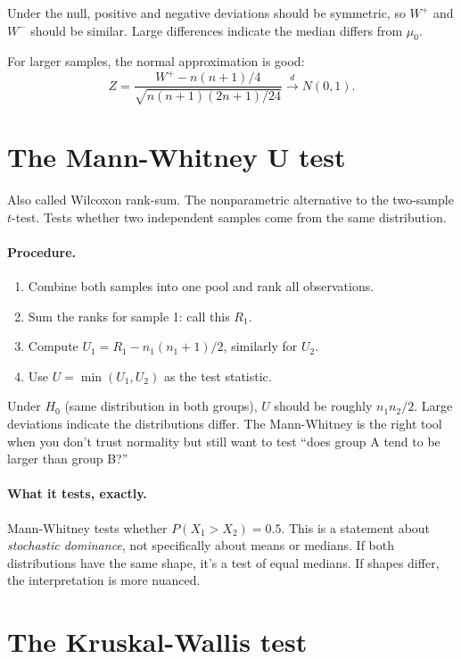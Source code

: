 Under the null, positive and negative deviations should be symmetric, so $W^+$ and $W^-$ should be similar. Large differences indicate the median differs from $\mu_0$.

For larger samples, the normal approximation is good:
\[
  Z = \frac{W^+ - n(n+1)/4}{\sqrt{n(n+1)(2n+1)/24}} \xrightarrow{d} N(0, 1).
\]

\section{The Mann-Whitney U test}

Also called Wilcoxon rank-sum. The nonparametric alternative to the two-sample $t$-test. Tests whether two independent samples come from the same distribution.

\paragraph{Procedure.}
\begin{enumerate}[noitemsep]
  \item Combine both samples into one pool and rank all observations.
  \item Sum the ranks for sample 1: call this $R_1$.
  \item Compute $U_1 = R_1 - n_1(n_1+1)/2$, similarly for $U_2$.
  \item Use $U = \min(U_1, U_2)$ as the test statistic.
\end{enumerate}

Under $H_0$ (same distribution in both groups), $U$ should be roughly $n_1 n_2 / 2$. Large deviations indicate the distributions differ. The Mann-Whitney is the right tool when you don't trust normality but still want to test ``does group A tend to be larger than group B?''

\paragraph{What it tests, exactly.} Mann-Whitney tests whether $P(X_1 > X_2) = 0.5$. This is a statement about \emph{stochastic dominance}, not specifically about means or medians. If both distributions have the same shape, it's a test of equal medians. If shapes differ, the interpretation is more nuanced.

\section{The Kruskal-Wallis test}

